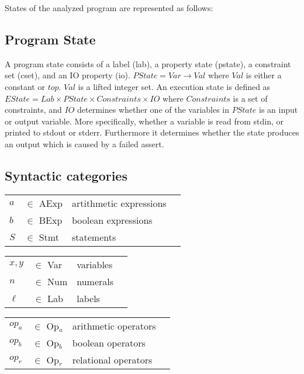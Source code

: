 \documentclass[natbib]{article}
\begin{document}
\noindent States of the analyzed program are represented as follows:

\subsection{Program State}

A program state consists of a label (lab), a property state (pstate),
a constraint set (cset), and an IO property (io). $PState = Var
\rightarrow Val$ where $Val$ is either a constant or $top$. $Val$ is a
lifted integer set. An execution state is defined as $EState = Lab \times
PState \times Constraints \times IO$ where $Constraints$ is a set of
constraints, and $IO$ determines whether one of the variables in $PState$ is
an input or output variable. More specifically, whether a variable is
read from stdin, or printed to stdout or stderr. Furthermore it
determines whether the state produces an output which is caused by a
failed assert.

\subsection{Syntactic categories}

\begin{tabular}{llll}
$a$ & $\in$ \textup{AExp} & artithmetic expressions \\
$b$ & $\in$ \textup{BExp} & boolean expressions \\
$S$ & $\in$ \textup{Stmt} & statements \\
\end{tabular}

\bigskip
\begin{tabular}{llll}
$x,y$ & $\in$ \textup{Var} & variables \\
$n$ & $\in$ \textup{Num} & numerals \\
$\ell$ & $\in$ \textup{Lab} & labels \\
\end{tabular}

\bigskip
\begin{tabular}{llll}
$op_a$ & $\in$ \textup{Op$_a$} & arithmetic operators \\
$op_b$ & $\in$ \textup{Op$_b$} & boolean operators \\
$op_r$ & $\in$ \textup{Op$_r$} & relational operators \\
\end{tabular}
\end{document}
